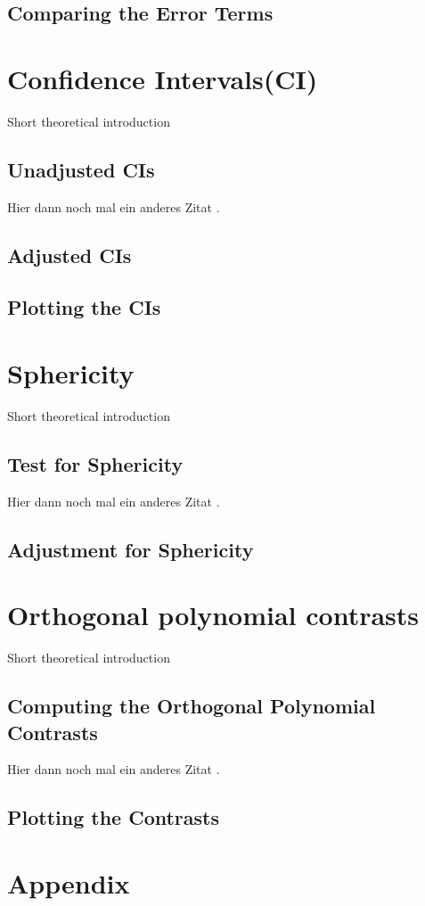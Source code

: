 \documentclass[11pt]{article}
\begin{document}
		\subsection{Comparing the Error Terms}
		
		
	\section{Confidence Intervals(CI)}
	Short theoretical introduction
		\subsection{Unadjusted CIs}
		Hier dann noch mal ein anderes Zitat \citep{003}.
		\subsection{Adjusted CIs}
		
		\subsection{Plotting the CIs}
		
	\section{Sphericity}
	Short theoretical introduction
		\subsection{Test for Sphericity}
		Hier dann noch mal ein anderes Zitat \citep{003}.
		\subsection{Adjustment for Sphericity}
	
	\section{Orthogonal polynomial contrasts}
	Short theoretical introduction
		\subsection{Computing the Orthogonal Polynomial Contrasts}
		Hier dann noch mal ein anderes Zitat \citep{003}.
		\subsection{Plotting the Contrasts}
	

 
	\section*{Appendix}
	\newpage
 
 
 
	
\end{document}
